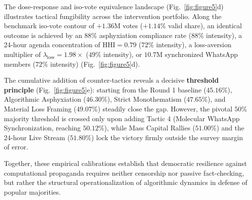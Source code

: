 \documentclass{article}
\begin{document}
The dose-response and iso-vote equivalence landscape (Fig.~\ref{fig:figure5}d) illustrates tactical fungibility across the intervention portfolio. Along the benchmark iso-vote contour of $+1.36\mathrm{M}$ votes ($+1.14\%$ valid share), an identical outcome is achieved by an $88\%$ asphyxiation compliance rate ($88\%$ intensity), a 24-hour agenda concentration of $\mathrm{HHI} = 0.79$ ($72\%$ intensity), a loss-aversion multiplier of $\lambda_{\mathrm{loss}} = 1.98\times$ ($49\%$ intensity), or $10.7\mathrm{M}$ synchronized WhatsApp members ($72\%$ intensity) (Fig.~\ref{fig:figure5}d).

The cumulative addition of counter-tactics reveals a decisive \textbf{threshold principle} (Fig.~\ref{fig:figure5}e): starting from the Round 1 baseline ($45.16\%$), Algorithmic Asphyxiation ($46.30\%$), Strict Monothematism ($47.65\%$), and Material Loss Framing ($49.07\%$) steadily close the gap. However, the pivotal $50\%$ majority threshold is crossed only upon adding Tactic 4 (Molecular WhatsApp Synchronization, reaching $50.12\%$), while Mass Capital Rallies ($51.00\%$) and the 24-hour Live Stream ($51.80\%$) lock the victory firmly outside the survey margin of error.

Together, these empirical calibrations establish that democratic resilience against computational propaganda requires neither censorship nor passive fact-checking, but rather the structural operationalization of algorithmic dynamics in defense of popular majorities.









\end{document}
